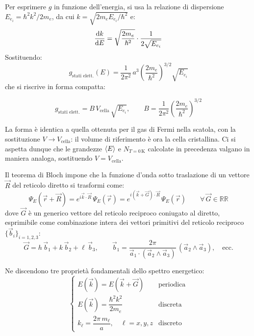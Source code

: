 Per esprimere \(g\) in funzione dell'energia, si usa la relazione di dispersione \(E_{e_i} = \hbar^2 k^2 / 2 m_e\), da cui \(k = \sqrt{2 m_e E_{e_i}/\hbar^2}\) e:
\begin{equation}
    \dv{k}{E} = \sqrt{\frac{2 m_e}{\hbar^2}} \cdot \frac{1}{2\sqrt{E_{e_i}}}
\end{equation}
Sostituendo:
\begin{equation}
    g_{\text{stati elett.}}(E) = \frac{1}{2\pi^2}\, a^3 \left(\frac{2 m_e}{\hbar^2}\right)^{3/2} \sqrt{E_{e_i}}
\end{equation}
che si riscrive in forma compatta:
\begin{importantbox}
    \begin{equation}
        g_{\text{stati elett.}} = B\, V_{\text{cella}}\, \sqrt{E_{e_i}}, \qquad B = \frac{1}{2\pi^2}\left(\frac{2 m_e}{\hbar^2}\right)^{3/2}
    \end{equation}
\end{importantbox}
La forma è identica a quella ottenuta per il gas di Fermi nella scatola, con la sostituzione \(V \to V_{\text{cella}}\): il volume di riferimento è ora la cella cristallina. Ci si aspetta dunque che le grandezze \(\expval{E}\) e \(N_{T = 0\,\text{K}}\) calcolate in precedenza valgano in maniera analoga, sostituendo \(V = V_{\text{cella}}\).

Il teorema di Bloch impone che la funzione d'onda sotto traslazione di un vettore \(\vec{R}\) del reticolo diretto si trasformi come:
\begin{equation}
    \Psi_E(\vec{r} + \vec{R}) = e^{i \vec{k}\cdot \vec{R}}\, \Psi_E(\vec{r}) = e^{i (\vec{k} + \vec{G})\cdot \vec{R}}\, \Psi_E(\vec{r}) \qquad \forall\, \vec{G} \in \mathbb{R}\mathbb{R}
\end{equation}
dove \(\vec{G}\) è un generico vettore del reticolo reciproco coniugato al diretto, esprimibile come combinazione intera dei vettori primitivi del reticolo reciproco \(\{\vec{b}_i\}_{i=1,2,3}\):
\begin{equation}
    \vec{G} = h\, \vec{b}_1 + k\, \vec{b}_2 + \ell\, \vec{b}_3, \qquad \vec{b}_1 = \frac{2\pi}{\vec{a}_1 \cdot (\vec{a}_2 \wedge \vec{a}_3)}\, (\vec{a}_2 \wedge \vec{a}_3), \quad \text{ecc.}
\end{equation}

Ne discendono tre proprietà fondamentali dello spettro energetico:
\begin{equation}
    \begin{cases}
        E(\vec{k}) = E(\vec{k} + \vec{G}) & \text{periodica} \\[2pt]
        E(\vec{k}) = \dfrac{\hbar^2 k^2}{2 m_e} & \text{discreta} \\[6pt]
        k_\ell = \dfrac{2\pi\, m_\ell}{a}, \quad \ell = x, y, z & \text{discreto}
    \end{cases}
\end{equation}

